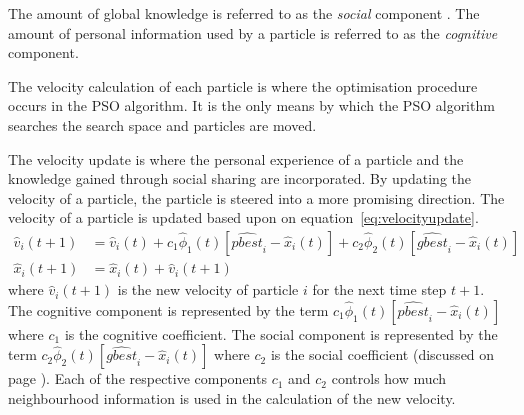 The amount of global knowledge is referred to as the \emph{social} \label{def:socialcomponent} component \cite{FundamentalSwarm,CompuIntelligenceIntro,PSOSelfHierarch,SOSwarm}. The amount of personal information used by a particle is referred to as the \emph{cognitive} \label{def:cognitivecomponent} component\cite{FundamentalSwarm,CompuIntelligenceIntro,PSOSelfHierarch,SOSwarm}.

The velocity calculation of each particle is where the optimisation procedure occurs in the \gls{PSO} algorithm. It is the only means by which the \gls{PSO} algorithm searches the search space and particles are moved\cite{CompuIntelligenceIntro}.

The velocity update is where the personal experience of a particle and the knowledge gained through social sharing are incorporated. By updating the velocity of a particle, the particle is steered into a more promising direction. The velocity of a particle is updated based upon on equation~\ref{eq:velocityupdate}.
\begin{align}
\hat{v}_i(t+1) &= \hat{v}_i(t) + c_1\hat{\phi}_1(t)[\hat{pbest}_i - \hat{x}_i(t)] + c_2\hat{\phi}_2(t)[\hat{gbest}_i - \hat{x}_i(t)]\label{eq:velocityupdate}\\
\hat{x}_i(t+1) &= \hat{x}_i(t) + \hat{v}_i(t+1)\label{eq:positionupdate}
\end{align}
where $\hat{v}_i(t+1)$ is the new velocity of particle $i$ for the next time step $t+1$. The cognitive component is represented by the term $c_1\hat{\phi}_1(t)[\hat{pbest}_i - \hat{x}_i(t)]$ where $c_1$ is the cognitive coefficient. The social component is represented by the term $c_2\hat{\phi}_2(t)[\hat{gbest}_i - \hat{x}_i(t)]$ where $c_2$ is the social coefficient (discussed on page \pageref{def:cognitivecomponent})\cite{FundamentalSwarm,CompuIntelligenceIntro}. Each of the respective components $c_1$ and $c_2$ controls how much neighbourhood information is used in the calculation of the new velocity. 

